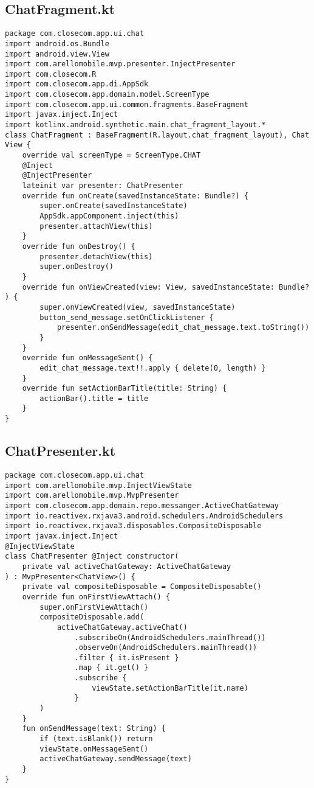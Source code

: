 \documentclass[listing]{espd}
\begin{document}
\subsection{ChatFragment.kt}
\begin{verbatim}
package com.closecom.app.ui.chat
import android.os.Bundle
import android.view.View
import com.arellomobile.mvp.presenter.InjectPresenter
import com.closecom.R
import com.closecom.app.di.AppSdk
import com.closecom.app.domain.model.ScreenType
import com.closecom.app.ui.common.fragments.BaseFragment
import javax.inject.Inject
import kotlinx.android.synthetic.main.chat_fragment_layout.*
class ChatFragment : BaseFragment(R.layout.chat_fragment_layout), Chat
View {
    override val screenType = ScreenType.CHAT
    @Inject
    @InjectPresenter
    lateinit var presenter: ChatPresenter
    override fun onCreate(savedInstanceState: Bundle?) {
        super.onCreate(savedInstanceState)
        AppSdk.appComponent.inject(this)
        presenter.attachView(this)
    }
    override fun onDestroy() {
        presenter.detachView(this)
        super.onDestroy()
    }
    override fun onViewCreated(view: View, savedInstanceState: Bundle?
) {
        super.onViewCreated(view, savedInstanceState)
        button_send_message.setOnClickListener {
            presenter.onSendMessage(edit_chat_message.text.toString())
        }
    }
    override fun onMessageSent() {
        edit_chat_message.text!!.apply { delete(0, length) }
    }
    override fun setActionBarTitle(title: String) {
        actionBar().title = title
    }
}
\end{verbatim}

\subsection{ChatPresenter.kt}
\begin{verbatim}
package com.closecom.app.ui.chat
import com.arellomobile.mvp.InjectViewState
import com.arellomobile.mvp.MvpPresenter
import com.closecom.app.domain.repo.messanger.ActiveChatGateway
import io.reactivex.rxjava3.android.schedulers.AndroidSchedulers
import io.reactivex.rxjava3.disposables.CompositeDisposable
import javax.inject.Inject
@InjectViewState
class ChatPresenter @Inject constructor(
    private val activeChatGateway: ActiveChatGateway
) : MvpPresenter<ChatView>() {
    private val compositeDisposable = CompositeDisposable()
    override fun onFirstViewAttach() {
        super.onFirstViewAttach()
        compositeDisposable.add(
            activeChatGateway.activeChat()
                .subscribeOn(AndroidSchedulers.mainThread())
                .observeOn(AndroidSchedulers.mainThread())
                .filter { it.isPresent }
                .map { it.get() }
                .subscribe {
                    viewState.setActionBarTitle(it.name)
                }
        )
    }
    fun onSendMessage(text: String) {
        if (text.isBlank()) return
        viewState.onMessageSent()
        activeChatGateway.sendMessage(text)
    }
}
\end{verbatim}
\end{document}
